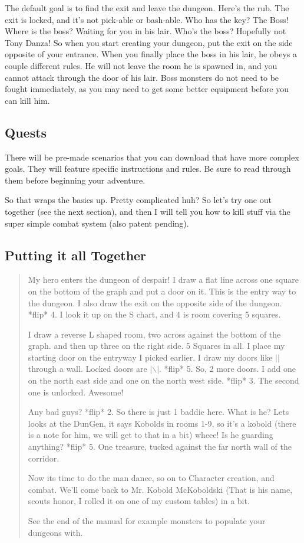 \documentclass[a6paper,hidelinks]{article}
\begin{document}
The default goal is to find the exit and leave the dungeon. Here’s the rub. The exit is locked, and it’s not pick-able or bash-able. Who has the key? The Boss! Where is the boss? Waiting for you in his lair. Who’s the boss? Hopefully not Tony Danza! So when you start creating your dungeon, put the exit on the side opposite of your entrance. When you finally place the boss in his lair, he obeys a couple different rules. He will not leave the room he is spawned in, and you cannot attack through the door of his lair. Boss monsters do not need to be fought immediately, as you may need to get some better equipment before you can kill him.

\subsection{Quests}
There will be pre-made scenarios that you can download that have more complex goals. They will feature specific instructions and rules. Be sure to read through them before beginning your adventure.

So that wraps the basics up. Pretty complicated huh? So let’s try one out together (see the next section),
and then I will tell you how to kill stuff via the super simple combat system (also patent pending).

\subsection{Putting it all Together}

\begin{quote}
My hero enters the dungeon of despair! I draw a flat line across one square on the bottom of the graph and put a
door on it. This is the entry way to the dungeon. I also draw the exit on the opposite side of the dungeon. *flip* 4. I look it up on the S chart, and 4 is room covering 5 squares.

I draw a reverse L shaped room, two across against the bottom of the graph. and then up three on the right side. 5 Squares in all. I place my starting door on the entryway I picked earlier. I draw my doors like $| |$ through a wall. Locked doors are $|\backslash|$.
*flip* 5. So, 2 more doors. I add one on the north east side and one on the north west side. *flip* 3. The second one is unlocked. Awesome!

Any bad guys? *flip* 2.  So there is just 1 baddie here. What is he? Lets looks at the DunGen, it says Kobolds in rooms 1-9, so it’s a kobold (there is a note for him, we will get to that in a bit) wheee!  Is he guarding anything? *flip* 5.  One treasure, tucked against the far north wall of the corridor.

Now its time to do the man dance, so on to Character creation, and combat. We'll come back to Mr. Kobold McKoboldski (That is his name, scouts honor, I rolled it on one of my custom tables) in a bit.

See the end of the manual for example monsters to populate your dungeons with.

\end{quote}
\end{document}
